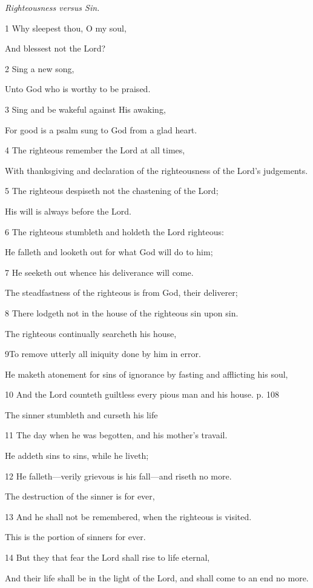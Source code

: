 \par \textit{Righteousness versus Sin.}

\par 1 Why sleepest thou, O my soul,
\par  And blessest not the Lord?
\par 2 Sing a new song,
\par  Unto God who is worthy to be praised.
\par 3 Sing and be wakeful against His awaking,
\par  For good is a psalm sung to God from a glad heart.
\par    
\par 4 The righteous remember the Lord at all times,
\par  With thanksgiving and declaration of the righteousness of the Lord's judgements.
\par 5 The righteous despiseth not the chastening of the Lord;
\par  His will is always before the Lord.
\par 6 The righteous stumbleth and holdeth the Lord righteous:
\par  He falleth and looketh out for what God will do to him;
\par 7 He seeketh out whence his deliverance will come.
\par  The steadfastness of the righteous is from God, their deliverer;
\par 8 There lodgeth not in the house of the righteous sin upon sin.
\par  The righteous continually searcheth his house,
\par 9To remove utterly all iniquity done by him in error.
\par  He maketh atonement for sins of ignorance by fasting and afflicting his soul,
\par 10 And the Lord counteth guiltless every pious man and his house. p. 108
\par  The sinner stumbleth and curseth his life
\par 11 The day when he was begotten, and his mother's travail.
\par  He addeth sins to sins, while he liveth;
\par 12 He falleth—verily grievous is his fall—and riseth no more.
\par  The destruction of the sinner is for ever,
\par 13 And he shall not be remembered, when the righteous is visited.
\par  This is the portion of sinners for ever.
\par    
\par 14 But they that fear the Lord shall rise to life eternal,
\par  And their life shall be in the light of the Lord, and shall come to an end no more.

